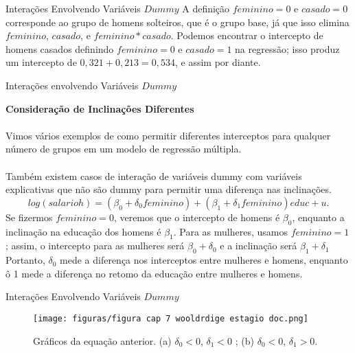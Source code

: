 \documentclass[t,14pt,mathserif]{beamer}
\begin{document}
{
\begin{frame}{Interações Envolvendo Variáveis $Dummy$}
		\justifying
       \vfill
       A definição $feminino = 0$ e $casado = 0$ corresponde ao grupo de homens solteiros, que é o grupo base, já que isso elimina $feminino$, $casado$, e $feminino*casado$.
        \vfill
        Podemos encontrar o intercepto de homens casados definindo $feminino = 0$ e $casado = 1$ na regressão; isso produz um intercepto de $0,321 + 0,213 = 0,534$, e assim por diante.
        \vfill
      
\end{frame}
}  

{
\begin{frame}{Interações envolvendo Variáveis $Dummy$}
		\begin{tcolorbox}
			\indent\textbf{\small{Consideração de Inclinações Diferentes}}\\ 
			\\ \footnotesize{Vimos vários exemplos de como permitir diferentes interceptos para qualquer número de grupos em um modelo de regressão múltipla}.\\
			\\ \footnotesize{Também existem casos de interação de variáveis dummy com variáveis explicativas que não são dummy para permitir uma diferença nas inclinações.}
			\begin{equation}
			log(salarioh) = (\beta_{0} + \delta_{0}feminino) + (\beta_{1} + \delta_{1}feminino)educ + u.\label{eq1}\nonumber
			\end{equation}
		   \footnotesize{Se fizermos $feminino = 0$, veremos que o intercepto de homens é $\beta_{0}$, enquanto a inclinação na educação dos homens é $\beta_{1}$. Para as mulheres, usamos $feminino = 1$; assim, o intercepto para as mulheres será $\beta_{0} + \delta_{0}$ e a inclinação será $\beta_{1} + \delta_{1}$ Portanto, $\delta_{0}$ mede a diferença nos interceptos entre mulheres e homens, enquanto ô 1 mede a diferença no retomo da educação entre mulheres e homens.}
			
		\end{tcolorbox}
       
\end{frame}
} 
 
{
\begin{frame}{Interações Envolvendo Variáveis $Dummy$}
	 \begin{tcolorbox}
	   \begin{figure}
		\centering
		\caption{\footnotesize{Gráficos da equação anterior. (a) $\delta_{0} < 0$, $\delta_{1} < 0$ ; (b) $\delta_{0}< 0$, $\delta_{1} > 0.$}}
		\texttt{[image: figuras/figura cap 7 wooldrdige estagio doc.png]}
		\label{fig21}
	\end{figure}
			
		\end{tcolorbox}
       
\end{frame}
}  
\end{document}
